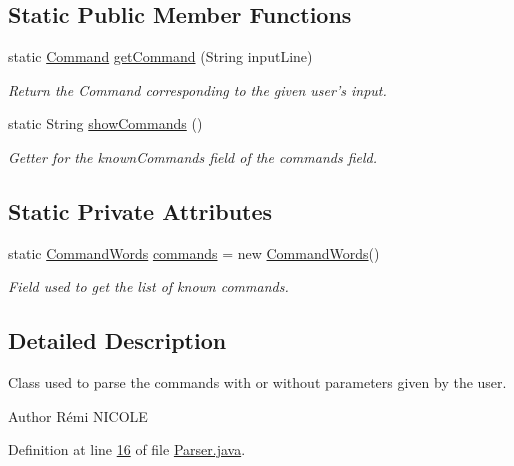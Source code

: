 \subsection*{Static Public Member Functions}
\begin{DoxyCompactItemize}
\item 
static \hyperlink{classpkg__commands_1_1Command}{Command} \hyperlink{classpkg__parsing_1_1Parser_a3baac59980671aeb689ca25fba64e9cc}{get\-Command} (String input\-Line)
\begin{DoxyCompactList}\small\item\em Return the Command corresponding to the given user's input. \end{DoxyCompactList}\item 
static String \hyperlink{classpkg__parsing_1_1Parser_a31545cdbdb409aaeb727289c0ea7be1b}{show\-Commands} ()
\begin{DoxyCompactList}\small\item\em Getter for the known\-Commands field of the commands field. \end{DoxyCompactList}\end{DoxyCompactItemize}
\subsection*{Static Private Attributes}
\begin{DoxyCompactItemize}
\item 
static \hyperlink{classpkg__parsing_1_1CommandWords}{Command\-Words} \hyperlink{classpkg__parsing_1_1Parser_a0e5263205b63cc2c006361a92558132a}{commands} = new \hyperlink{classpkg__parsing_1_1CommandWords}{Command\-Words}()
\begin{DoxyCompactList}\small\item\em Field used to get the list of known commands. \end{DoxyCompactList}\end{DoxyCompactItemize}


\subsection{Detailed Description}
Class used to parse the commands with or without parameters given by the user. 

\begin{DoxyAuthor}{Author}
Rémi N\-I\-C\-O\-L\-E 
\end{DoxyAuthor}


Definition at line \hyperlink{Parser_8java_source_l00016}{16} of file \hyperlink{Parser_8java_source}{Parser.\-java}.



